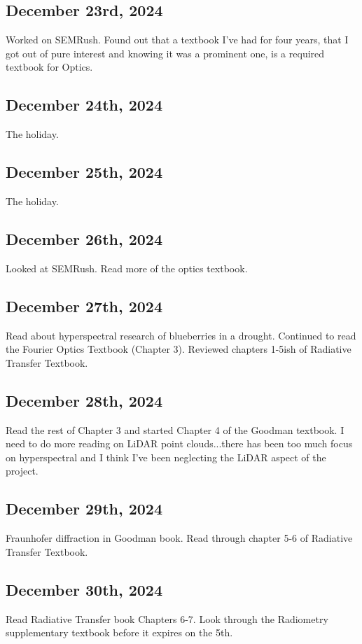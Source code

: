 \documentclass{article}
\begin{document}

\subsection{December 23rd, 2024}
Worked on SEMRush. 
Found out that a textbook I've had for four years, that I got out of pure interest and knowing it was a prominent one, is a required textbook for Optics. 

\subsection{December 24th, 2024}
The holiday. %

\subsection{December 25th, 2024}
The holiday. %

\subsection{December 26th, 2024}
Looked at SEMRush. Read more of the optics textbook. 

\subsection{December 27th, 2024}
Read about hyperspectral research of blueberries in a drought. Continued to read the Fourier Optics Textbook (Chapter 3). Reviewed chapters 1-5ish of Radiative Transfer Textbook. 

\subsection{December 28th, 2024}
Read the rest of Chapter 3 and started Chapter 4 of the Goodman textbook. I need to do more reading on LiDAR point clouds...there has been too much focus on hyperspectral and I think I've been neglecting the LiDAR aspect of the project. 


\subsection{December 29th, 2024}
Fraunhofer diffraction in Goodman book. Read through chapter 5-6 of Radiative Transfer Textbook. 

\subsection{December 30th, 2024}
Read Radiative Transfer book Chapters 6-7. Look through the Radiometry supplementary textbook before it expires on the 5th. 
\end{document}
